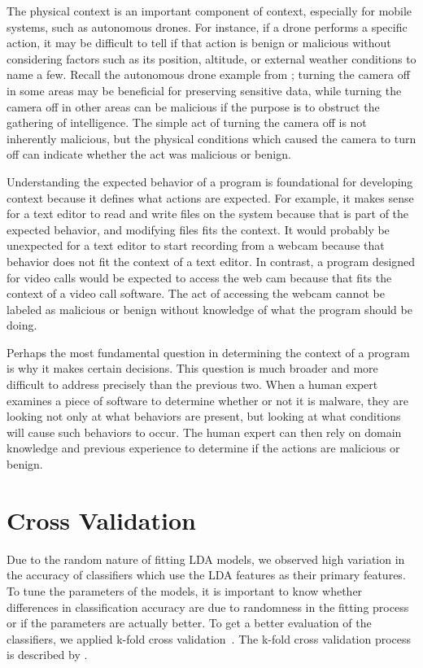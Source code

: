 \documentclass[../stegner_thesis.tex]{subfiles}
\begin{document}
\par The physical context is an important component of context, especially for
mobile systems, such as autonomous drones.
For instance, if a drone performs a specific action, it may be difficult to
tell if that action is benign or malicious without considering factors such
as its position, altitude, or external weather conditions to name a few.
Recall the autonomous drone example from ; turning
the camera off in some areas may be beneficial for preserving sensitive data,
while turning the camera off in other areas can be malicious if the purpose is
to obstruct the gathering of intelligence.
The simple act of turning the camera off is not inherently malicious, but the
physical conditions which caused the camera to turn off can indicate whether
the act was malicious or benign.

\par Understanding the expected behavior of a program is foundational for
developing context because it defines what actions are expected.
For example, it makes sense for a text editor to read and write files on the
system because that is part of the expected behavior, and modifying files fits
the context.
It would probably be unexpected for a text editor to start recording from a
webcam because that behavior does not fit the context of a text editor.
In contrast, a program designed for video calls would be expected to access
the web cam because that fits the context of a video call software.
The act of accessing the webcam cannot be labeled as malicious or benign
without knowledge of what the program should be doing.

\par Perhaps the most fundamental question in determining the context of a
program is why it makes certain decisions.
This question is much broader and more difficult to address precisely than the
previous two.
When a human expert examines a piece of software to determine whether or not
it is malware, they are looking not only at what behaviors are present, but
looking at what conditions will cause such behaviors to occur.
The human expert can then rely on domain knowledge and previous experience to
determine if the actions are malicious or benign.

\section{Cross Validation}%
\label{sec:mthd_cross_valid}

\par Due to the random nature of fitting LDA models, we observed high
variation in the accuracy of classifiers which use the LDA features as their
primary features.
To tune the parameters of the models, it is important to know whether
differences in classification accuracy are due to randomness in the fitting
process or if the parameters are actually better.
To get a better evaluation of the classifiers, we applied k-fold cross
validation~\cite{hastieElementsStatistical}.
The k-fold cross validation process is described by .
\end{document}
